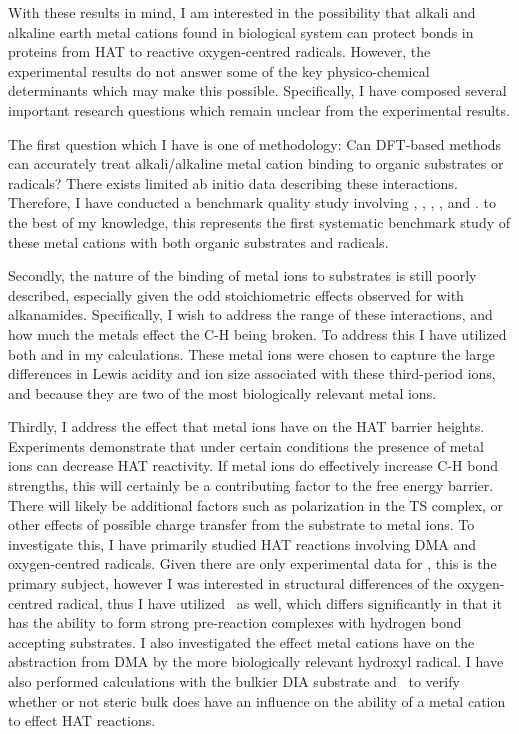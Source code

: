With these results in mind, I am interested in the possibility that alkali and alkaline earth metal cations found in biological system can protect  bonds in proteins from HAT to reactive oxygen-centred radicals. However, the experimental results do not answer some of the key physico-chemical determinants which may make this possible. Specifically, I have composed several important research questions which remain unclear from the experimental results.

The first question which I have is one of methodology: Can DFT-based methods can accurately treat alkali/alkaline metal cation binding to organic substrates or radicals? There exists limited ab initio data describing these interactions.\cite{ Siu2001, Corral2003, Suarez2011, Baldauf2013} Therefore, I have conducted a benchmark quality study involving , , , , and . to the best of my knowledge, this represents the first systematic benchmark study of these metal cations with both organic substrates and radicals.

Secondly, the nature of the binding of metal ions to substrates is still poorly described, especially given the odd stoichiometric effects observed for  with alkanamides. Specifically, I wish to address the range of these interactions, and how much the metals effect the C-H being broken. To address this I have utilized both  and  in my calculations. These metal ions were chosen to capture the large differences in Lewis acidity and ion size associated with these third-period ions, and because they are two of the most biologically relevant metal ions.

Thirdly, I address the effect that metal ions have on the HAT barrier heights.
Experiments demonstrate that under certain conditions the presence of metal ions can decrease HAT reactivity. If metal ions do effectively increase C-H bond strengths, this will certainly be a contributing factor to the free energy barrier. There will likely be additional factors such as polarization in the TS complex, or other effects of possible charge transfer from the substrate to metal ions. To investigate this, I have primarily studied HAT reactions involving DMA and oxygen-centred radicals. Given there are only experimental data for \cumo, this is the primary subject, however I was interested in structural differences of the oxygen-centred radical, thus I have utilized \bno\ as well, which differs significantly in that it has the ability to form strong pre-reaction complexes with hydrogen bond accepting substrates.\cite{Salamone2012, Salamone2013} I also investigated the effect metal cations have on the abstraction from DMA by the more biologically relevant hydroxyl radical. I have also performed calculations with the bulkier DIA substrate and \cumo\ to verify whether or not steric bulk does have an influence on the ability of a metal cation to effect HAT reactions.

